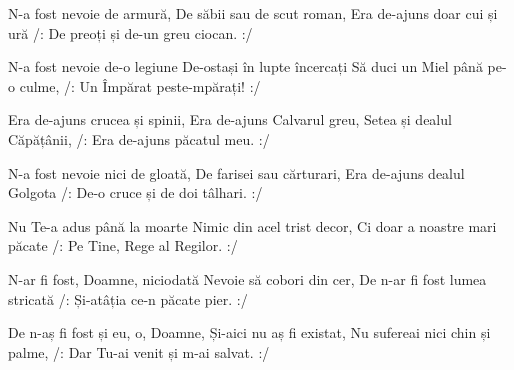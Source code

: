 \beginverse
N-a fost nevoie de armură,
De săbii sau de scut roman,
Era de-ajuns doar cui și ură
/: De preoți și de-un greu ciocan. :/
\endverse

\beginverse
N-a fost nevoie de-o legiune
De-ostași în lupte încercați
Să duci un Miel până pe-o culme,
/: Un Împărat peste-mpărați! :/
\endverse

\beginchorus
Era de-ajuns crucea și spinii,
Era de-ajuns Calvarul greu,
Setea și dealul Căpățânii,
/: Era de-ajuns păcatul meu. :/
\endchorus

\beginverse
N-a fost nevoie nici de gloată,
De farisei sau cărturari,
Era de-ajuns dealul Golgota
/: De-o cruce și de doi tâlhari. :/
\endverse

\beginverse
Nu Te-a adus până la moarte
Nimic din acel trist decor,
Ci doar a noastre mari păcate
/: Pe Tine, Rege al Regilor. :/
\endverse

\beginverse
N-ar fi fost, Doamne, niciodată
Nevoie să cobori din cer,
De n-ar fi fost lumea stricată
/: Și-atâția ce-n păcate pier. :/
\endverse

\beginverse
De n-aș fi fost și eu, o, Doamne,
Și-aici nu aș fi existat,
Nu sufereai nici chin și palme,
/: Dar Tu-ai venit și m-ai salvat. :/
\endverse
\endsong